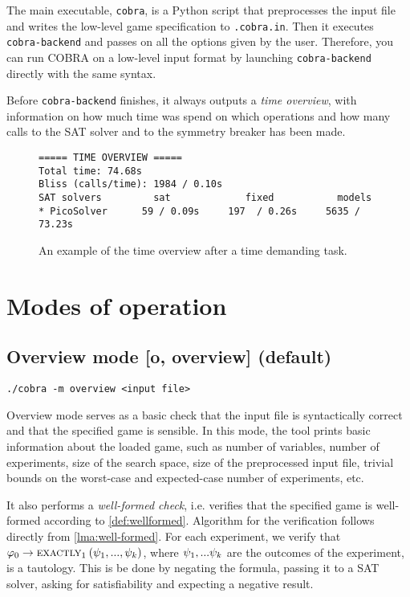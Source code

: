 The main executable, \texttt{cobra}, is a Python script that preprocesses
  the input file and writes the low-level game specification to \texttt{.cobra.in}.
Then it executes \texttt{cobra-backend} and passes on all the options given
  by the user.
Therefore, you can run COBRA on a low-level input format by launching
  \texttt{cobra-backend} directly with the same syntax.

Before \texttt{cobra-backend} finishes, it always outputs a \emph{time overview},
  with information on how much time was spend on which operations and
  how many calls to the SAT solver and to the symmetry breaker has been made.

\begin{figure}[ht]
\begin{lstlisting}
===== TIME OVERVIEW =====
Total time: 74.68s
Bliss (calls/time): 1984 / 0.10s
SAT solvers         sat             fixed           models
* PicoSolver      59 / 0.09s     197  / 0.26s     5635 / 73.23s
\end{lstlisting}
\caption{An example of the time overview after a time demanding task.}
\label{fig:timeoverview}
\end{figure}


\section{Modes of operation}\label{s:cobra-modes}

\subsection{Overview mode [o, overview] (default)}

\centerline{\texttt{./cobra -m overview <input file> }}
\medskip

Overview mode serves as a basic check that the input file is
  syntactically correct and that the specified game is sensible.
In this mode, the tool prints basic information about the loaded game, such as
  number of variables, number of experiments, size of the search space,
  size of the preprocessed input file,
  trivial bounds on the worst-case and expected-case number of experiments, etc.

It also performs a \emph{well-formed check}, i.e. verifies that the
  specified game is well-formed according to \autoref{def:wellformed}.
Algorithm for the verification follows directly from \autoref{lma:well-formed}.
For each experiment, we verify that
  $\varphi_0->\textsc{exactly}_{1}\:(\psi_1, ..., \psi_k)$,
  where $\psi_1,...\psi_k$ are the outcomes of the experiment,
  is a tautology.
This is be done by negating the formula,
  passing it to a SAT solver, asking for satisfiability
  and expecting a negative result.

